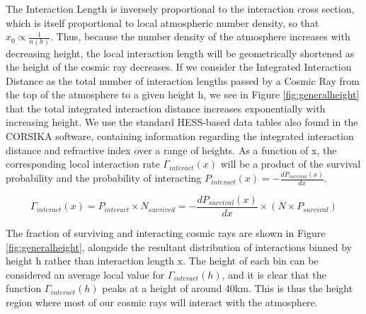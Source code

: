 \documentclass[11pt]{article}
\begin{document}
The Interaction Length is inversely proportional to the interaction cross section, which is itself proportional to local atmospheric number density, so that $x_{0} \propto \frac{1}{n(h)}$. Thus, because the number density of the atmosphere increases with decreasing height, the local interaction length will be geometrically shortened as the height of the cosmic ray decreases. If we consider the Integrated Interaction Distance as the total number of interaction lengths passed by a Cosmic Ray from the top of the atmosphere to a given height h, we see in Figure \ref{fig:generalheight} that the total integrated interaction distance increases exponentially with increasing height. We use the standard HESS-based data tables also found in the CORSIKA software, containing information regarding the integrated interaction distance and refractive index over a range of heights. As a function of x, the corresponding local interaction rate $\Gamma_{interact}(x)$ will be a product of the survival probability and the probability of interacting $P_{interact}(x)= -\frac{dP_{survival}(x)}{dx}$. 

\[ \Gamma_{interact}(x) = P_{interact} \times N_{survived} =  - \frac{dP_{survival}(x)}{dx} \times (N \times  P_{survival}) \]

The fraction of surviving and interacting cosmic rays are shown in Figure \ref{fig:generalheight}, alongside the resultant distribution of interactions binned by height h rather than interaction length x. The height of each bin can be considered an average local value for $\Gamma_{interact}(h)$, and it is clear that the function $\Gamma_{interact}(h)$ peaks at a height of around 40km. This is thus the height region where most of our cosmic rays will interact with the atmosphere.
\end{document}
